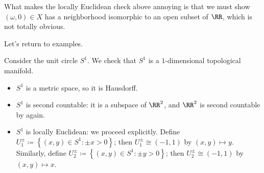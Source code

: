 \documentclass[../notes.tex]{subfiles}
\begin{document}
\begin{remark}
	What makes the locally Euclidean check above annoying is that we must show $(\omega,0)\in X$ has a neighborhood isomorphic to an open subset of $\RR$, which is not totally obvious.
\end{remark}
Let's return to examples.
\begin{example}
	Consider the unit circle $S^1$. We check that $S^1$ is a $1$-dimensional topological manifold.
	\begin{itemize}
		\item $S^1$ is a metric space, so it is Hausdorff.
		\item $S^1$ is second countable: it is a subspace of $\RR^2$, and $\RR^2$ is second countable by  again.
		\item $S^1$ is locally Euclidean: we proceed explicitly. Define $U_1^\pm\coloneqq\left\{(x,y)\in S^1:\pm x>0\right\}$; then $U_1^\pm\cong(-1,1)$ by $(x,y)\mapsto y$. Similarly, define $U_2^\pm\coloneqq\left\{(x,y)\in S^1:\pm y>0\right\}$; then $U_2^\pm\cong(-1,1)$ by $(x,y)\mapsto x$.
	\end{itemize}
\end{example}
\end{document}
